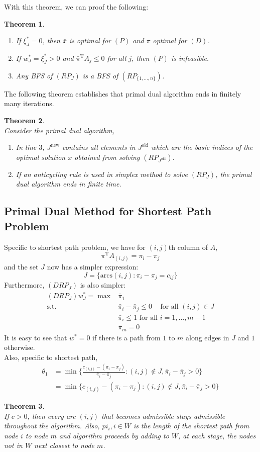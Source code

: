 \documentclass[12pt]{article}
\newcommand{\st}{\mathrm{s.t.}}
\newcommand{\T}{\mathrm{T}}
\newtheorem{theorem}{Theorem}[section]
\theoremstyle{definition}
\begin{document}
With this theorem, we can proof the following:
\begin{theorem}
\hfill\\\normalfont \begin{enumerate}
\item If $\xi_J^\ast = 0$, then $\bar{x}$ is optimal for $(P)$ and $\pi$ optimal for $(D)$.
\item If $w_J^\ast = \xi_J^\ast>0$ and $\bar{\pi}^\T A_j\leq 0$ for all $j$, then $(P)$ is infeasible.
\item Any BFS of $(RP_J)$ is a BFS of $(RP_{\{1,\ldots, n\}})$.
\end{enumerate}
\end{theorem}
The following theorem establishes that primal dual algorithm ends in finitely many iterations.
\begin{theorem}
\hfill\\\normalfont Consider the primal dual algorithm,
\begin{enumerate}
  \item In line $3$, $J^\text{new}$ contains all elements in $J^\text{old}$ which are the basic indices of the optimal solution $x$ obtained from solving $(RP_{J^\text{old}})$.
  \item If an anticycling rule is used in simplex method to solve $(RP_J)$, the primal dual algorithm ends in finite time.
\end{enumerate}
\end{theorem}
\subsection{Primal Dual Method for Shortest Path Problem}
Specific to shortest path problem, we have for $(i,j)$th column of $A$,
\[
\pi^\T A_{(i,j)}=\pi_i-\pi_j
\]
and the set $J$ now has a simpler expression:
\[
J=\{\text{arcs} (i,j): \pi_i-\pi_j=c_{ij}\}
\]
Furthermore, $(DRP_J)$ is also simpler:
\begin{align*}
(DRP_J) w_J^\ast = \max &\bar{\pi}_1\\
\st & \bar{\pi}_i-\bar{\pi}_j\leq 0\;\;\;\text{ for all }(i,j)\in J\\
&\bar{\pi}_i\leq 1\text{ for all }i=1,\ldots, m-1\\
&\bar{\pi}_m=0
\end{align*}
It is easy to see that $w^\ast=0$ if there is a path from $1$ to $m$ along edges in $J$ and $1$ otherwise.\\
Also, specific to shortest path, 
\begin{align*}
\theta_1&=\min\{\frac{c_{(i,j)}-(\pi_i-\pi_j)}{\bar{\pi}_i-\bar{\pi}_j}:(i,j)\not\in J, \bar{\pi}_i-\bar{\pi}_j>0\}\\&=\min\{c_{(i,j)}-(\pi_i-\pi_j):(i,j)\not\in J, \bar{\pi}_i-\bar{\pi}_j>0\}
\end{align*}
\begin{theorem}
\hfill\\\normalfont If $c>0$, then every arc $(i,j)$ that becomes admissible stays admissible throughout the algorithm. Also, $pi_i,i\in W$ is the length of the shortest path from node $i$ to node $m$ and algorithm proceeds by adding to $W$, at each stage, the nodes not in $W$ next closest to node $m$.
\end{theorem}
\end{document}
